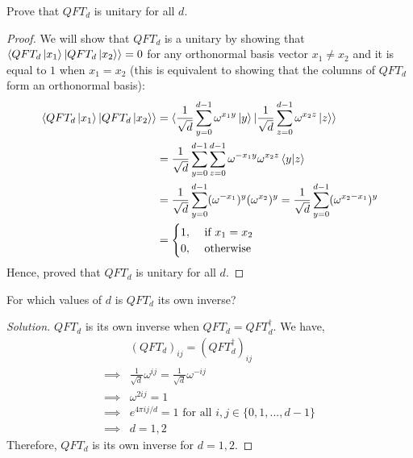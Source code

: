 \begin{solution}[label=ques:2b]
  \begin{question}
    Prove that $QFT_d$ is unitary for all $d$.
  \end{question}
  \tcblower{}
  \begin{proof}
    We will show that $QFT_d$ is a unitary by showing that $\braket{QFT_d\ket{x_1}|QFT_d\ket{x_2}} = 0$ for any orthonormal basis vector $x_1 \neq x_2$ and it is equal to $1$ when $x_1 = x_2$ (this is equivalent to showing that the columns of $QFT_d$ form an orthonormal basis):
    \begin{equation}
      \begin{split}
        \braket{QFT_d\ket{x_1}|QFT_d\ket{x_2}} &= \braket{\frac{1}{\sqrt{d}}\sum^{d-1}_{y=0}\omega^{x_1y}\ket{y}|\frac{1}{\sqrt{d}}\sum^{d-1}_{z=0}\omega^{x_2z}\ket{z}}\\
        &= \frac{1}{\sqrt{d}}\sum_{y=0}^{d-1}\sum_{z=0}^{d-1}\omega^{-x_1y}\omega^{x_2z}\braket{y|z}\\
        &= \frac{1}{\sqrt{d}}\sum_{y=0}^{d-1}(\omega^{-x_1})^y(\omega^{x_2})^y = \frac{1}{\sqrt{d}}\sum_{y=0}^{d-1}(\omega^{x_2-x_1})^y\\
        &= \begin{cases}
          1, &\text{ if }x_1 = x_2\\
          0, &\text{ otherwise}
        \end{cases}
      \end{split}
      \label{eq:qft_unitary}
    \end{equation}
    Hence, proved that $QFT_d$ is unitary for all $d$.
  \end{proof}
\end{solution}

\begin{solution}[label=ques:2c]
  \begin{question}
    For which values of $d$ is $QFT_d$ its own inverse?
  \end{question}
  \tcblower{}
  \begin{proof}[Solution]
    $QFT_d$ is its own inverse when $QFT_d = QFT_d^\dagger$. We have,
    \begin{equation}
      \begin{split}
        &(QFT_d)_{ij} = (QFT_d^\dagger)_{ij}\\
        \implies &\frac{1}{\sqrt{d}}\omega^{ij} = \frac{1}{\sqrt{d}}\omega^{-ij}\\
        \implies &\omega^{2ij} = 1\\
        \implies &e^{4\pi ij/d} = 1\text{ for all }i, j \in \{0,1,...,d-1\}\\
        \implies &d = 1, 2
      \end{split}
      \label{eq:qft_inverse}
    \end{equation}
    Therefore, $QFT_d$ is its own inverse for $d = 1, 2$.
  \end{proof}
\end{solution}

